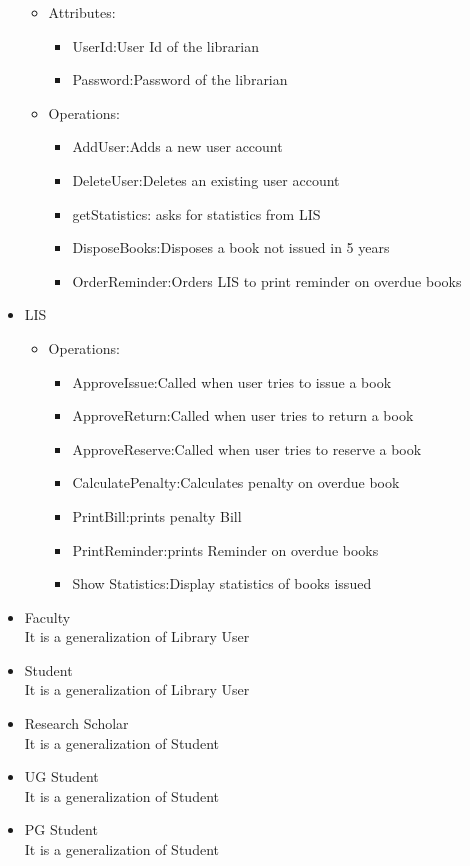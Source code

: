 \documentclass{article}
\begin{document}
\begin{itemize}
\begin{itemize}
\item Attributes:
\begin{itemize}
\item UserId:User Id of the librarian
\item Password:Password of the librarian
\end{itemize}
\item Operations:
\begin{itemize}
\item AddUser:Adds a new user account
\item DeleteUser:Deletes an existing user account
\item getStatistics: asks for statistics from LIS
\item DisposeBooks:Disposes a book not issued in 5 years
\item OrderReminder:Orders LIS to print reminder on overdue books
\end{itemize}
\end{itemize}

\item LIS
\begin{itemize}
\item Operations:\\
\begin{itemize}

\item ApproveIssue:Called when user tries to issue a book
\item ApproveReturn:Called when user tries to return a book

\item ApproveReserve:Called when user tries to reserve a book
\item CalculatePenalty:Calculates penalty on overdue book
\item PrintBill:prints penalty Bill
\item PrintReminder:prints Reminder on overdue books
\item Show Statistics:Display statistics of books issued

\end{itemize}
\end{itemize}

\item Faculty\\
It is a generalization of Library User
\item Student\\
It is a generalization of Library User
\item Research Scholar\\
It is a generalization of Student
\item UG Student\\
It is a generalization of Student
\item PG Student\\
It is a generalization of Student

\end{itemize}
\end{document}
